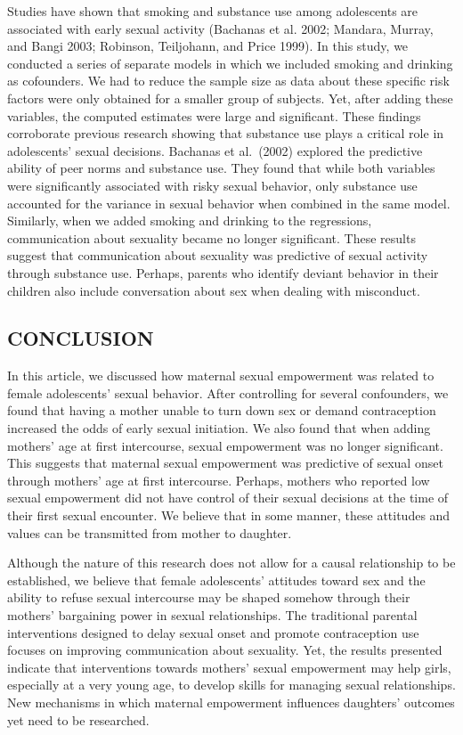 \documentclass[
]{article}
\begin{document}
Studies have shown that smoking and substance use among adolescents are
associated with early sexual activity (Bachanas et al. 2002; Mandara,
Murray, and Bangi 2003; Robinson, Teiljohann, and Price 1999). In this
study, we conducted a series of separate models in which we included
smoking and drinking as cofounders. We had to reduce the sample size as
data about these specific risk factors were only obtained for a smaller
group of subjects. Yet, after adding these variables, the computed
estimates were large and significant. These findings corroborate
previous research showing that substance use plays a critical role in
adolescents' sexual decisions. Bachanas et al.~(2002) explored the
predictive ability of peer norms and substance use. They found that
while both variables were significantly associated with risky sexual
behavior, only substance use accounted for the variance in sexual
behavior when combined in the same model. Similarly, when we added
smoking and drinking to the regressions, communication about sexuality
became no longer significant. These results suggest that communication
about sexuality was predictive of sexual activity through substance use.
Perhaps, parents who identify deviant behavior in their children also
include conversation about sex when dealing with misconduct.

\hypertarget{conclusion}{%
\subsection{CONCLUSION}\label{conclusion}}

In this article, we discussed how maternal sexual empowerment was
related to female adolescents' sexual behavior. After controlling for
several confounders, we found that having a mother unable to turn down
sex or demand contraception increased the odds of early sexual
initiation. We also found that when adding mothers' age at first
intercourse, sexual empowerment was no longer significant. This suggests
that maternal sexual empowerment was predictive of sexual onset through
mothers' age at first intercourse. Perhaps, mothers who reported low
sexual empowerment did not have control of their sexual decisions at the
time of their first sexual encounter. We believe that in some manner,
these attitudes and values can be transmitted from mother to daughter.

Although the nature of this research does not allow for a causal
relationship to be established, we believe that female adolescents'
attitudes toward sex and the ability to refuse sexual intercourse may be
shaped somehow through their mothers' bargaining power in sexual
relationships. The traditional parental interventions designed to delay
sexual onset and promote contraception use focuses on improving
communication about sexuality. Yet, the results presented indicate that
interventions towards mothers' sexual empowerment may help girls,
especially at a very young age, to develop skills for managing sexual
relationships. New mechanisms in which maternal empowerment influences
daughters' outcomes yet need to be researched.
\end{document}
